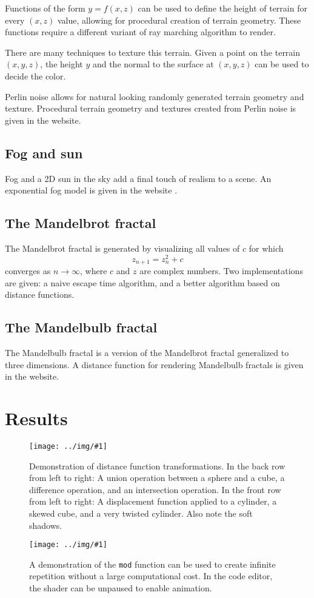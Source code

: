 \documentclass[parskip=full]{scrartcl}
\newcommand\graphic[1]{\texttt{[image: ../img/\#1]}}
\begin{document}
Functions of the form $y=f(x,z)$ can be used to define the height of terrain
for every $(x,z)$ value, allowing for procedural creation of terrain geometry.
These functions require a different variant of ray marching algorithm to
render.

There are many techniques to texture this terrain. Given a point on the terrain
$(x,y,z)$, the height $y$ and the normal to the surface at $(x,y,z)$ can be
used to decide the color.

Perlin noise allows for natural looking randomly generated terrain geometry and
texture. Procedural terrain geometry and textures created from Perlin noise is
given in the website.

\subsection{Fog and sun}

Fog and a 2D sun in the sky add a final touch of realism to a scene.
An exponential fog model is given in the website \cite{microsoft-fog-formulas}.

\subsection{The Mandelbrot fractal}

The Mandelbrot fractal is generated by visualizing all values of $c$ for which
\[
    z_{n+1}=z_n^2+c
\]
converges as $n\to\infty$, where $c$ and $z$ are complex numbers. Two
implementations are given: a naive escape time algorithm, and a better
algorithm based on distance functions.

\subsection{The Mandelbulb fractal}

The Mandelbulb fractal is a version of the Mandelbrot fractal generalized to
three dimensions. A distance function for rendering Mandelbulb fractals is
given in the website.

\section{Results}

\begin{figure}[H]
    \graphic{shading.png}
    \caption{Demonstration of distance function transformations. In the back
        row from left to right: A union operation between a sphere and a cube,
        a difference operation, and an intersection operation. In the front
        row from left to right: A displacement function applied to a cylinder,
        a skewed cube, and a very twisted cylinder. Also note the soft
        shadows.}
    \bigskip
    \graphic{infinite-spheres.png}
    \caption{A demonstration of the \texttt{mod} function can be used to create
        infinite repetition without a large computational cost. In the code
        editor, the shader can be unpaused to enable animation.}
\end{figure}
\end{document}
